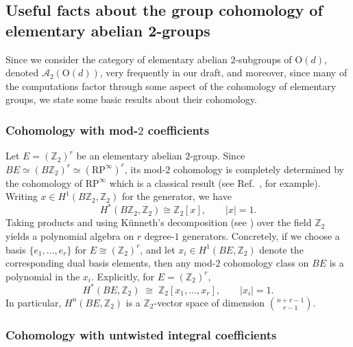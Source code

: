 \documentclass[aps,prx,reprint,superscriptaddress,twocolumn,amsmath,amssymb,amsfonts, nofootinbib]{revtex4-2}
\newcommand{\qa}{\mathcal{A}_{2}}
\newcommand{\Z}{\mathbb{Z}}
\theoremstyle{apsstyle}
\begin{document}
\subsection{Useful facts about the group cohomology of elementary abelian 2-groups}
\label{app:elem}

Since we consider the category of elementary abelian $2$-subgroups of $\mathrm{O}(d)$, denoted $\qa(\mathrm{O}(d))$, very frequently in our draft, and moreover, since many of the computations factor through some aspect of the cohomology of elementary groups, we state some basic results about their cohomology.

\subsubsection{Cohomology with mod-$2$ coefficients}
\label{app:elem_mod2}

Let $E=(\Z_{2})^{r}$ be an elementary abelian $2$-group. Since $BE\simeq (B\Z_{2})^{r}\simeq (\mathrm{RP}^{\infty})^{r}$, its mod-$2$ cohomology is completely determined by the cohomology of $\mathrm{RP}^{\infty}$ which is a classical result (see Ref.~\cite{Milnor}, for example). Writing $x\in H^{1}(B\Z_{2},\Z_{2})$ for the generator, we have
\begin{equation*}
    H^{*}(B\Z_{2},\Z_{2})\cong \Z_{2}[x],\qquad |x|=1.
\end{equation*}
Taking products and using K\"unneth's decomposition (see ) over the field $\Z_{2}$ yields a polynomial algebra on $r$ degree-$1$ generators. Concretely, if we choose a basis $\{e_{1},\dots,e_{r}\}$ for $E\cong (\Z_{2})^{r}$, and let $x_{i}\in H^{1}(BE,\Z_{2})$ denote the corresponding dual basis elements, then any mod-$2$ cohomology class on $BE$ is a polynomial in the $x_{i}$. Explicitly, for $E=(\Z_{2})^{r}$,
\begin{equation}
\label{eq:elem_mod2}
    H^{*}(BE,\Z_{2}) \;\cong\; \Z_{2}[x_{1},\dots,x_{r}],
    \qquad |x_{i}|=1.
\end{equation}
In particular, $H^{n}(BE,\Z_{2})$ is a $\Z_{2}$-vector space of dimension $\binom{n+r-1}{r-1}$.


\subsubsection{Cohomology with untwisted integral coefficients}
\label{app:elem_integer}
\end{document}
